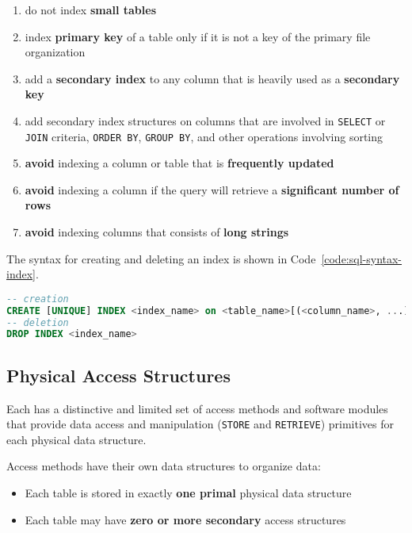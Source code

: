 \documentclass[english]{article}
\begin{document}
\begin{enumerate}
  \item do not index \textbf{small tables}
  \item index \textbf{primary key }of a table only if it is not a key of the primary file organization
  \item add a \textbf{secondary index} to any column that is heavily used as a \textbf{secondary key}
  \item add secondary index structures on columns that are involved in \texttt{SELECT} or \texttt{JOIN} criteria, \texttt{ORDER BY}, \texttt{GROUP BY}, and other operations involving sorting
  \item \textbf{avoid} indexing a column or table that is \textbf{frequently updated}
  \item \textbf{avoid} indexing a column if the query will retrieve a \textbf{significant number of rows}
  \item \textbf{avoid} indexing columns that consists of \textbf{long strings}
\end{enumerate}

The \sql syntax for creating and deleting an index is shown in Code~\ref{code:sql-syntax-index}.

\begin{lstlisting}[language=SQL, caption={\sql syntax for creating and deleting an index}, label={code:sql-syntax-index}]
-- creation
CREATE [UNIQUE] INDEX <index_name> on <table_name>[(<column_name>, ...)]
-- deletion
DROP INDEX <index_name>
\end{lstlisting}

\subsection{Physical Access Structures}

Each \dbms has a distinctive and limited set of access methods and software modules that provide data access and manipulation (\texttt{STORE} and \texttt{RETRIEVE}) primitives for each physical data structure.

Access methods have their own data structures to organize data:

\begin{itemize}
  \item Each table is stored in exactly \textbf{one primal} physical data structure
  \item Each table may have \textbf{zero or more secondary} access structures
\end{itemize}
\end{document}
